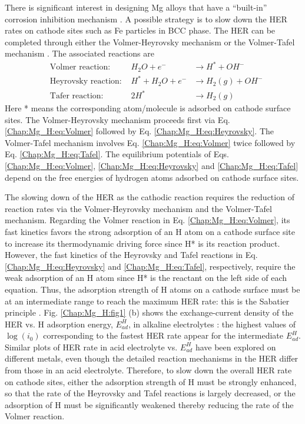 There is significant interest in designing Mg alloys that have a “built-in” corrosion inhibition mechanism \cite{eaves2012inhibition}. A possible strategy is to slow down the HER rates on cathode sites such as Fe particles in \ac{BCC} phase. The HER can be completed through either the Volmer-Heyrovsky mechanism or the Volmer-Tafel mechanism \cite{ghali2010corrosion,walling1968electrochemical}. The associated reactions are
\begin{subequations}
\begin{align}
&\text{Volmer reaction:    } & H_2O + e^- & \rightarrow H^* + OH^-
 \label{Chap:Mg_H:eq:Volmer}\\
&\text{Heyrovsky reaction:    } & H^* + H_2O + e^- & \rightarrow H_2(g) + OH^-
 \label{Chap:Mg_H:eq:Heyrovsky}\\
&\text{Tafer reaction:    }
& 2H^* & \rightarrow H_2(g)
 \label{Chap:Mg_H:eq:Tafel}
\end{align}
\end{subequations}
Here * means the corresponding atom/molecule is adsorbed on cathode surface sites. The Volmer-Heyrovsky mechanism proceeds first via Eq. \ref{Chap:Mg_H:eq:Volmer} followed by Eq. \ref{Chap:Mg_H:eq:Heyrovsky}. The Volmer-Tafel mechanism involves Eq. \ref{Chap:Mg_H:eq:Volmer} twice followed by Eq. \ref{Chap:Mg_H:eq:Tafel}. The equilibrium potentials of Eqs. \ref{Chap:Mg_H:eq:Volmer}, \ref{Chap:Mg_H:eq:Heyrovsky} and \ref{Chap:Mg_H:eq:Tafel} depend on the free energies of hydrogen atoms adsorbed on cathode surface sites.


The slowing down of the HER as the cathodic reaction requires the reduction of reaction rates via the Volmer-Heyrovsky mechanism and the Volmer-Tafel mechanism. Regarding the Volmer reaction in Eq. \ref{Chap:Mg_H:eq:Volmer}, its fast kinetics favors the strong adsorption of an H atom on a cathode surface site to increase its thermodynamic driving force since H* is its reaction product. However, the fast kinetics of the Heyrovsky and Tafel reactions in Eq. \ref{Chap:Mg_H:eq:Heyrovsky} and \ref{Chap:Mg_H:eq:Tafel}, respectively, require the weak adsorption of an H atom since H* is the reactant on the left side of each equation. Thus, the adsorption strength of H atoms on a cathode surface must be at an intermediate range to reach the maximum \ac{HER} rate: this is the Sabatier principle \cite{medford2015sabatier}. Fig. \ref{Chap:Mg_H:fig1} (b) shows the exchange-current density of the \ac{HER} vs. H adsorption energy, $E_{ad}^H$, in alkaline electrolytes \cite{sheng2013correlating}: the highest values of $\log(i_0)$ corresponding to the fastest \ac{HER} rate appear for the intermediate $E_{ad}^H$. Similar plots of \ac{HER} rate in acid electrolyte vs. $E_{ad}^H$ have been explored on different metals, even though the detailed reaction mechanisms in the \ac{HER} differ from those in an acid electrolyte. Therefore, to slow down the overall \ac{HER} rate on cathode sites, either the adsorption strength of H must be strongly enhanced, so that the rate of the Heyrovsky and Tafel reactions is largely decreased, or the adsorption of H must be significantly weakened thereby reducing the rate of the Volmer reaction.

